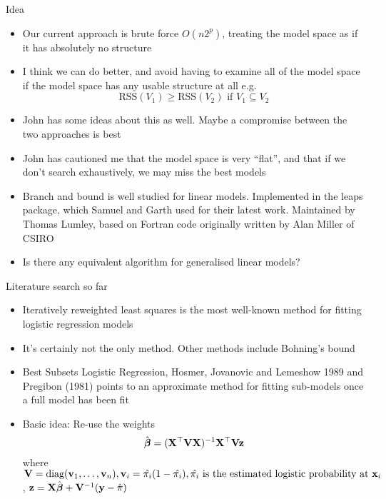 \documentclass{beamer}
\begin{document}
\begin{frame}{Idea}
\begin{itemize}
\item Our current approach is brute force $O(n 2^p)$, treating the model space as if it has absolutely
			no structure
\item I think we can do better, and avoid having to examine all of the model space if the model space
			has any usable structure at all e.g.
			$$\text{RSS}(V_1) \geq \text{RSS}(V_2) \text{ if } V_1 \subseteq V_2$$
\item John has some ideas about this as well. Maybe a compromise between the two approaches is
			best
\item John has cautioned me that the model space is very ``flat'', and that if we don't search exhaustively,
			we may miss the best models
\item Branch and bound is well studied for linear models. Implemented in the leaps package, which Samuel
			and Garth used for their latest work. Maintained by Thomas Lumley, based on Fortran code originally
			written by Alan Miller of CSIRO
\item Is there any equivalent algorithm for generalised linear models?
\end{itemize}
\end{frame}

\begin{frame}{Literature search so far}
\begin{itemize}
\item Iteratively reweighted least squares is the most well-known method for fitting logistic regression
			models
\item It's certainly not the only method. Other methods include Bohning's bound
\item Best Subsets Logistic Regression, Hosmer, Jovanovic and Lemeshow 1989 and Pregibon (1981) points to an 					approximate method for fitting sub-models once a full model has been fit
\item Basic idea: Re-use the weights
$$\hat{{\boldsymbol \beta}} = ({\bf X}^\top {\bf V} {\bf X})^{-1} {\bf X}^\top {\bf V} {\bf z}$$
where ${\bf V} = \text{diag}({\bf v}_1, \ldots, {\bf v}_n), {\bf v}_i = \hat{\pi_i} (1 - \hat{\pi_i}),
\hat{\pi_i} \text{ is the estimated logistic probability at } {\bf x}_i$,
${\bf z} = {\bf X} \hat{{\boldsymbol \beta}} + {\bf V}^{-1} ({\bf y} - \hat{\pi})$
\end{itemize}
\end{frame}
\end{document}
